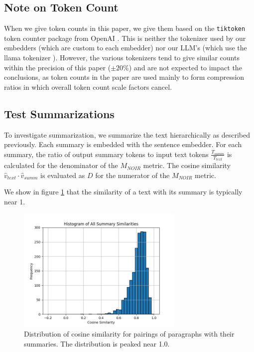 \documentclass{article}
\begin{document}
{\subsection{Note on Token Count}

When we give token counts in this paper, we give them based on the \texttt{tiktoken} token counter package from OpenAI \citet{tiktoken}.
This is neither the tokenizer used by our embedders (which are custom to each embedder) nor our LLM's (which use the llama tokenizer \citet{touvron_llama_2023}).  However, the various tokenizers tend to give similar counts within the precision of this paper ($\pm 20\%$) and are not expected to impact the conclusions, as token counts in the paper are used mainly to form compression ratios in which overall token count scale factors cancel.

\subsection{Test Summarizations}

To investigate summarization, we summarize the text hierarchically as described previously.  
Each summary is embedded with the sentence embedder.  
For each summary, the ratio of output summary tokens to input text tokens $\frac{T_{summ}}{T_{text}}$ is calculated for the denominator of the $M_{NOIR}$ metric.  
The cosine similarity $\hat{v}_{text}\cdot\hat{v}_{summ}$ is evaluated as $D$ for the numerator of the $M_{NOIR}$ metric.

We show in figure \ref{fig:summary_similarities} that the similarity of a text with its summary is typically near 1.

\begin{figure}
	\centering
	\includegraphics[height=6cm]{Histogram_of_All_Summary_Similarities.png}
	\caption{Distribution of cosine similarity for pairings of paragraphs with their summaries.  The distribution is peaked near 1.0.}
	\label{fig:summary_similarities}
\end{figure}

}
\end{document}
